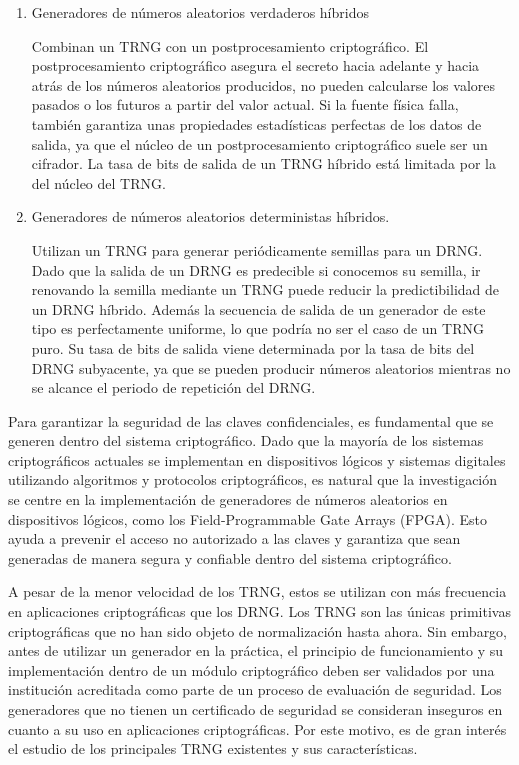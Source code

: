 			\begin{enumerate}		
		        \item Generadores de números aleatorios verdaderos híbridos
				
				Combinan un TRNG con un postprocesamiento criptográfico. El postprocesamiento criptográfico asegura el secreto hacia adelante y hacia atrás de los números aleatorios producidos, no pueden calcularse los valores pasados o los futuros a partir del valor actual. Si la fuente física falla, también garantiza unas propiedades estadísticas perfectas de los datos de salida, ya que el núcleo de un postprocesamiento criptográfico suele ser un cifrador. La tasa de bits de salida de un TRNG híbrido está limitada por la del núcleo del TRNG.
				
				\item Generadores de números aleatorios deterministas híbridos. 
				
		            Utilizan un TRNG para generar periódicamente semillas para un DRNG. Dado que la salida de un DRNG es predecible si conocemos su semilla, ir renovando la semilla mediante un TRNG puede reducir la predictibilidad de un DRNG híbrido. Además la secuencia de salida de un generador de este tipo es perfectamente uniforme, lo que podría no ser el caso de un TRNG puro. Su tasa de bits de salida viene determinada por la tasa de bits del DRNG subyacente, ya que se pueden producir números aleatorios mientras no se alcance el periodo de repetición del DRNG.
			\end{enumerate}

            Para garantizar la seguridad de las claves confidenciales, es fundamental que se generen dentro del sistema criptográfico. Dado que la mayoría de los sistemas criptográficos actuales se implementan en dispositivos lógicos y sistemas digitales utilizando algoritmos y protocolos criptográficos, es natural que la investigación se centre en la implementación de generadores de números aleatorios en dispositivos lógicos, como los Field-Programmable Gate Arrays (FPGA). Esto ayuda a prevenir el acceso no autorizado a las claves y garantiza que sean generadas de manera segura y confiable dentro del sistema criptográfico.
		
	        A pesar de la menor velocidad de los TRNG, estos se utilizan con más frecuencia en aplicaciones criptográficas que los DRNG. Los TRNG son las únicas primitivas criptográficas que no han sido objeto de normalización hasta ahora. Sin embargo, antes de utilizar un generador en la práctica, el principio de funcionamiento y su implementación dentro de un módulo criptográfico deben ser validados por una institución acreditada como parte de un proceso de evaluación de seguridad. Los generadores que no tienen un certificado de seguridad se consideran inseguros en cuanto a su uso en aplicaciones criptográficas. Por este motivo, es de gran interés el estudio de los principales TRNG existentes y sus características.
	
